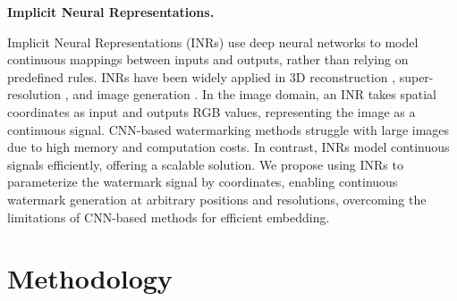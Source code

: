 \documentclass{article}
\begin{document}
\textbf{Implicit Neural Representations.} 

Implicit Neural Representations (INRs) use deep neural networks to model continuous mappings between inputs and outputs, rather than relying on predefined rules. INRs have been widely applied in 3D reconstruction \cite{mildenhall2021nerf, gafni2021dynamic, hui2024microdiffusion}, super-resolution \cite{chen2021learning, yang2021implicit, chen2022videoinr}, and image generation \cite{skorokhodov2021adversarial, shaham2021spatially, anokhin2021image}. In the image domain, an INR takes spatial coordinates as input and outputs RGB values, representing the image as a continuous signal. CNN-based watermarking methods struggle with large images due to high memory and computation costs. In contrast, INRs model continuous signals efficiently, offering a scalable solution. We propose using INRs to parameterize the watermark signal by coordinates, enabling continuous watermark generation at arbitrary positions and resolutions, overcoming the limitations of CNN-based methods for efficient embedding.


\section{Methodology}
\end{document}
